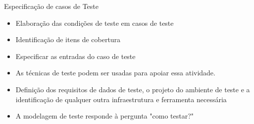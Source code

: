 
\begin{frame}{Especificação de casos de Teste}
    \begin{itemize}
        \item Elaboração das condições de teste em casos de teste
        \item Identificação de itens de cobertura
        \item Especificar as entradas do caso de teste
        \item As técnicas de teste podem ser usadas para apoiar essa atividade. 
        \item Definição dos requisitos de dados de teste, o projeto do
ambiente de teste e a identificação de qualquer outra infraestrutura e ferramenta necessária
        \item A modelagem de teste responde à pergunta "como testar?"
    \end{itemize}
\end{frame}